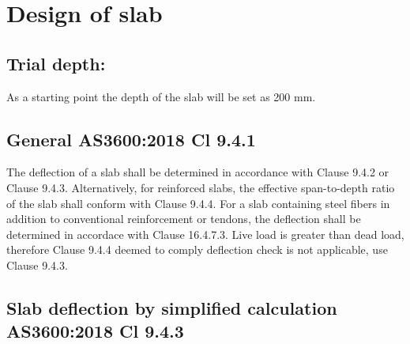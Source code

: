 \documentclass{article}%
\begin{document}
%
\normalsize%
\section*{Design of slab}%
\label{sec:Designofslab}%
\subsection*{Trial depth:}%
\label{subsec:Trialdepth}%

%
As a starting point the depth of the slab will be set as 200 mm.%
\subsection*{General AS3600:2018 Cl 9.4.1}%
\label{subsec:GeneralAS36002018Cl9.4.1}%

%
The deflection of a slab shall be determined in accordance with Clause 9.4.2 or Clause 9.4.3.\newline%
\newline%
Alternatively, for reinforced slabs, the effective span{-}to{-}depth ratio of the slab shall conform with Clause 9.4.4.\newline%
\newline%
For a slab containing steel fibers in addition to conventional reinforcement or tendons, the deflection shall be determined in accordace with Clause 16.4.7.3.\newline%
%
\newline%
 Live load is greater than dead load, therefore Clause 9.4.4 deemed to comply deflection check is not applicable, use Clause 9.4.3.%
\subsection*{Slab deflection by simplified calculation  AS3600:2018 Cl 9.4.3}%
\label{subsec:SlabdeflectionbysimplifiedcalculationAS36002018Cl9.4.3}%
\end{document}
